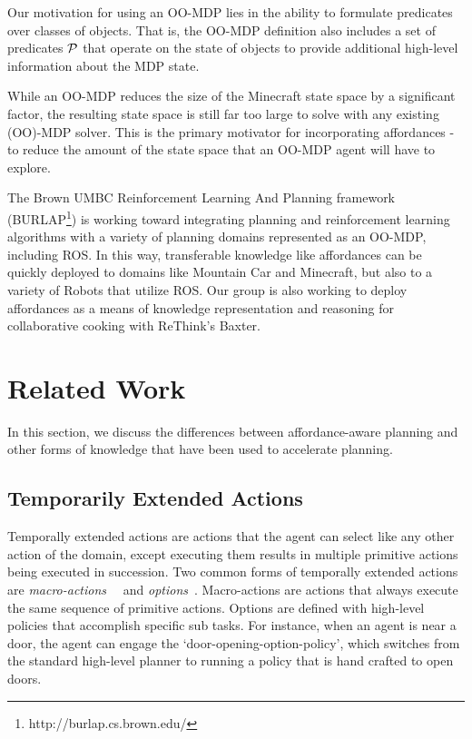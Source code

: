 \documentclass[conference]{IEEEtran}
\begin{document}
Our motivation for using an OO-MDP lies in the ability to
formulate predicates over classes of objects. That is, the OO-MDP
definition also includes a set of predicates ${\cal P}$ that operate
on the state of objects to provide additional high-level information
about the MDP state. 

While an OO-MDP reduces the size of the Minecraft state space
by a significant factor, the resulting state space is still far too large to
solve with any existing (OO)-MDP solver. This is the primary motivator
for incorporating affordances - to reduce the amount of the
state space that an OO-MDP agent will have to explore.

The Brown UMBC Reinforcement Learning And Planning framework (BURLAP\footnote{http://burlap.cs.brown.edu/})
is working toward integrating planning and reinforcement learning algorithms with a variety of planning domains represented
as an OO-MDP, including ROS. In this way, transferable knowledge like affordances can be quickly deployed
to domains like Mountain Car \cite{Moore90efficientmemory-based} and Minecraft, but also to a variety
of Robots that utilize ROS. Our group is also working to deploy affordances as a
means of knowledge representation and reasoning for collaborative cooking with ReThink's Baxter.

\section{Related Work}
\label{sec:related-work}

In this section, we discuss the differences between
affordance-aware planning and other forms of knowledge that
have been used to accelerate planning.

\subsection{Temporarily Extended Actions}
Temporally extended actions are actions that the agent can
select like any other action of the domain, except executing them
results in multiple primitive actions being executed in
succession. Two common forms of temporally extended actions are {\em
  macro-actions}~\cite{hauskrecht98} ~and {\em options}~\cite{sutton99}. 
Macro-actions are actions that always
execute the same sequence of primitive actions. Options are defined
with high-level policies that accomplish specific sub tasks. For
instance, when an agent is near a door, the agent can engage the
`door-opening-option-policy', which switches from the standard
high-level planner to running a policy that is hand crafted to open
doors. 
\end{document}
